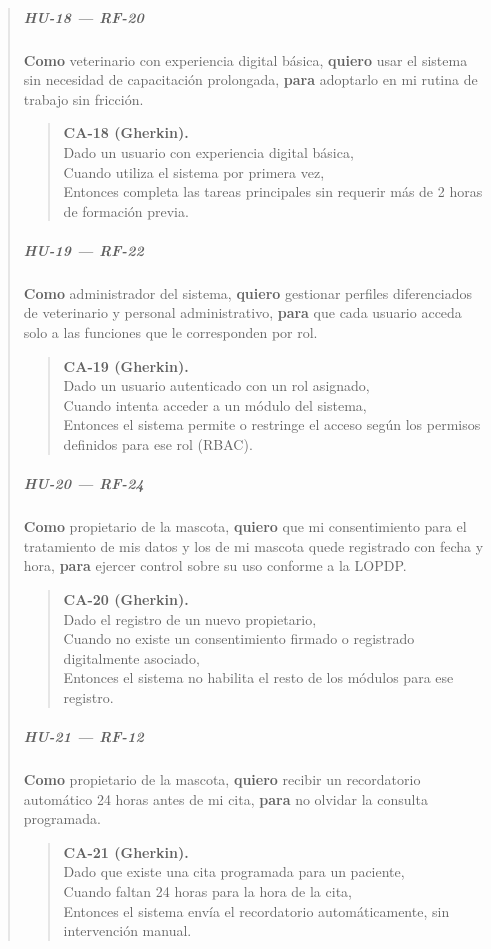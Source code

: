 \documentclass[
]{article}
\begin{document}
\begin{quote}
\subparagraph{HU-18 --- RF-20}
\textbf{Como} veterinario con experiencia digital básica,
\textbf{quiero} usar el sistema sin necesidad de capacitación prolongada,
\textbf{para} adoptarlo en mi rutina de trabajo sin fricción.

\begin{quote}
\textbf{CA-18 (Gherkin).} \\
Dado un usuario con experiencia digital básica, \\
Cuando utiliza el sistema por primera vez, \\
Entonces completa las tareas principales sin requerir más de 2 horas de formación previa.
\end{quote}

\subparagraph{HU-19 --- RF-22}
\textbf{Como} administrador del sistema,
\textbf{quiero} gestionar perfiles diferenciados de veterinario y personal administrativo,
\textbf{para} que cada usuario acceda solo a las funciones que le corresponden por rol.

\begin{quote}
\textbf{CA-19 (Gherkin).} \\
Dado un usuario autenticado con un rol asignado, \\
Cuando intenta acceder a un módulo del sistema, \\
Entonces el sistema permite o restringe el acceso según los permisos definidos para ese rol (RBAC).
\end{quote}

\subparagraph{HU-20 --- RF-24}
\textbf{Como} propietario de la mascota,
\textbf{quiero} que mi consentimiento para el tratamiento de mis datos y los de mi mascota quede registrado con fecha y hora,
\textbf{para} ejercer control sobre su uso conforme a la LOPDP.

\begin{quote}
\textbf{CA-20 (Gherkin).} \\
Dado el registro de un nuevo propietario, \\
Cuando no existe un consentimiento firmado o registrado digitalmente asociado, \\
Entonces el sistema no habilita el resto de los módulos para ese registro.
\end{quote}

\subparagraph{HU-21 --- RF-12}
\textbf{Como} propietario de la mascota,
\textbf{quiero} recibir un recordatorio automático 24 horas antes de mi cita,
\textbf{para} no olvidar la consulta programada.

\begin{quote}
\textbf{CA-21 (Gherkin).} \\
Dado que existe una cita programada para un paciente, \\
Cuando faltan 24 horas para la hora de la cita, \\
Entonces el sistema envía el recordatorio automáticamente, sin intervención manual.
\end{quote}


\end{quote}
\end{document}
